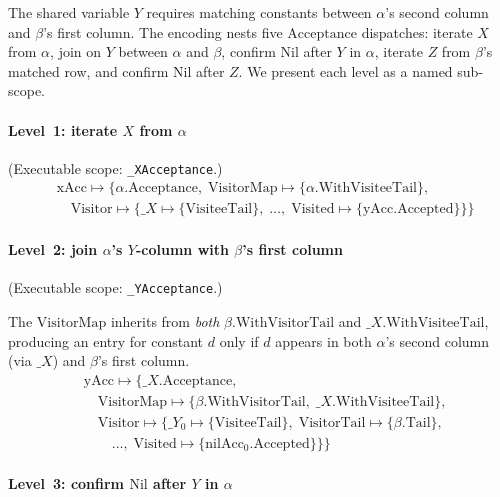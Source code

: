 The shared variable $Y$ requires matching constants
between $\alpha$'s second column and $\beta$'s first column.
The encoding nests five $\mathrm{Acceptance}$ dispatches:
iterate $X$ from $\alpha$, join on $Y$ between $\alpha$
and $\beta$, confirm $\mathrm{Nil}$ after $Y$ in $\alpha$,
iterate $Z$ from $\beta$'s matched row, and confirm
$\mathrm{Nil}$ after $Z$.
We present each level as a named sub-scope.

\paragraph{Level~1: iterate $X$ from $\alpha$}
(Executable scope: \texttt{\_XAcceptance}.)
{\small
  \begin{align*}
    &\mathrm{xAcc} \mapsto \{
      \alpha.\mathrm{Acceptance},\;
      \mathrm{VisitorMap} \mapsto \{\alpha.\mathrm{WithVisiteeTail}\},\\
      &\quad \mathrm{Visitor} \mapsto \{
        \_X \mapsto \{\mathrm{VisiteeTail}\},\;
        \ldots,\;
    \mathrm{Visited} \mapsto \{\mathrm{yAcc}.\mathrm{Accepted}\}\}\}
\end{align*}}

\paragraph{Level~2: join $\alpha$'s $Y$-column with $\beta$'s first column}

(Executable scope: \texttt{\_YAcceptance}.)

The $\mathrm{VisitorMap}$ inherits from \emph{both}
$\beta.\mathrm{WithVisitorTail}$ and
$\_X.\mathrm{WithVisiteeTail}$, producing an entry for
constant $d$ only if $d$ appears in both $\alpha$'s
second column (via $\_X$) and $\beta$'s first column.
{\small
  \begin{align*}
    &\mathrm{yAcc} \mapsto \{
      \_X.\mathrm{Acceptance},\\
      &\quad \mathrm{VisitorMap} \mapsto \{
        \beta.\mathrm{WithVisitorTail},\;
      \_X.\mathrm{WithVisiteeTail}\},\\
      &\quad \mathrm{Visitor} \mapsto \{
        \_Y_0 \mapsto \{\mathrm{VisiteeTail}\},\;
        \mathrm{VisitorTail} \mapsto \{\beta.\mathrm{Tail}\},\\
        &\qquad
        \ldots,\;
    \mathrm{Visited} \mapsto \{\mathrm{nilAcc}_0.\mathrm{Accepted}\}\}\}
\end{align*}}

\paragraph{Level~3: confirm $\mathrm{Nil}$ after $Y$ in $\alpha$}

